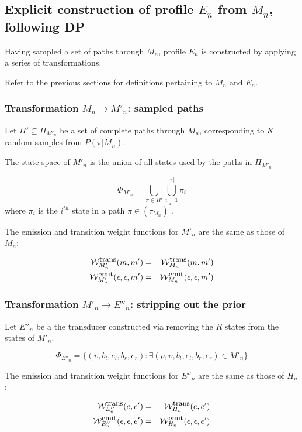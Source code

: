 \documentclass{article}
\newcommand{\seclabel}[1]{\label{sec.#1}}
\newcommand\States{\Phi}
\newcommand\statesof[1]{\States_{#1}}
\newcommand\Transitions{\tau}
\newcommand\transitionsof[1]{\Transitions_{#1}}
\newcommand\weight{{\cal W}}
\newcommand\weightfunof[1]{\weight_{#1}}
\newcommand\transweightfun[1]{\weightfunof{#1}^{\mbox{\small trans}}}
\newcommand\emitweightfun[1]{\weightfunof{#1}^{\mbox{\small emit}}}
\newcommand\hstate{(\upsilon,b_l,e_l,b_r,e_r)}
\newcommand\mstate{(\rho,\upsilon,b_l,e_l,b_r,e_r)}
\begin{document}
\subsection{Explicit construction of profile $E_n$ from $M_n$, following DP}
\seclabel{Mn2En}

Having sampled a set of paths through $M_n$, profile $E_n$ is constructed by applying a series of transformations.

Refer to the previous sections for definitions pertaining to $M_n$ and $E_n$.

\subsubsection{Transformation $M_n \to M'_n$: sampled paths}

Let $\Pi' \subseteq \Pi_{M'_n}$ be a set of complete paths through $M_n$,
corresponding to $K$ random samples from $P(\pi|M_n)$.

The state space of $M'_n$ is the union of all states used by the paths in  $\Pi_{M'_n}$

\[ 
\statesof{M'_n} = \bigcup_{\pi \in \Pi'} \bigcup_{i=1}^{|\pi|} \pi_i  
\]
where $\pi_i$ is the $i^{th}$ state in a path $\pi \in (\transitionsof{M_n})^\ast$.

The emission and transition weight functions for $M'_n$ are the same as those of $M_n$:

\begin{eqnarray*}
\transweightfun{M'_n}(m,m') & = & \transweightfun{M_n}(m,m') \\
\emitweightfun{M'_n}(\epsilon,\epsilon,m') & = & \emitweightfun{M_n}(\epsilon,\epsilon,m')
\end{eqnarray*}


\subsubsection{Transformation $M'_n \to E''_n$: stripping out the prior}

Let $E''_n$ be a the transducer constructed via removing the $R$ states from the states of $M'_n$.  

\[
\statesof{E''_n} = \{ \hstate : \exists \mstate \in M'_n \}
\]

The emission and transition weight functions for $E''_n$ are the same as those of $H_n$:

\begin{eqnarray*}
\transweightfun{E''_n}(e,e') & = & \transweightfun{H_n}(e,e') \\
\emitweightfun{E''_n}(\epsilon,\epsilon,e') & = & \emitweightfun{H_n}(\epsilon,\epsilon,e')
\end{eqnarray*}
\end{document}

